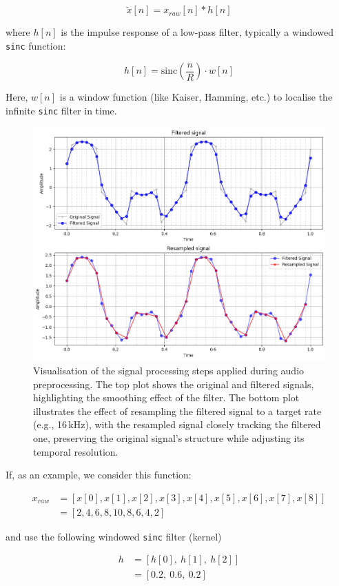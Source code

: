 \documentclass[conference]{IEEEtran}
\begin{document}
	$$\tilde{x}[n] = x_{raw}[n] * h[n]$$
	
	where $h[n]$ is the impulse response of a low-pass filter, typically a windowed \texttt{sinc} function:
	
	$$h[n] = \text{sinc}\left(\frac{n}{R}\right) \cdot w[n]$$
	
	Here, $w[n]$ is a window function (like Kaiser, Hamming, etc.) to localise the infinite \texttt{sinc} filter in time.
	
	\begin{figure}[H]
		\centering
		\includegraphics[width=0.9\linewidth]{img/img-resampling}
		\caption{Visualisation of the signal processing steps applied during audio preprocessing. The top plot shows the original and filtered signals, highlighting the smoothing effect of the filter. The bottom plot illustrates the effect of resampling the filtered signal to a target rate (e.g., 16\,kHz), with the resampled signal closely tracking the filtered one, preserving the original signal's structure while adjusting its temporal resolution.}
		\label{fig:img-resampling}
	\end{figure}
	
	If, as an example, we consider this function:
	
	\begin{align*}
		x_{raw} &=[x[0], x[1], x[2], x[3], x[4], x[5], x[6], x[7], x[8]]\\
		&=[2, 4, 6, 8, 10, 8, 6, 4, 2]
	\end{align*}
	
	and use the following windowed \texttt{sinc} filter (kernel)
	
	\begin{align*}
		h &= [h[0],\ h[1],\ h[2]]\\
		&= [0.2,\ 0.6,\ 0.2]
	\end{align*}
	
\end{document}
